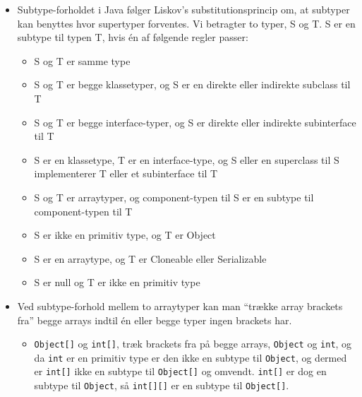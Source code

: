 \begin{itemize}
  \item Subtype-forholdet i Java følger Liskov’s substitutionsprincip om, at subtyper kan benyttes hvor supertyper forventes. Vi betragter to typer, S og T. S er en subtype til typen T, hvis én af følgende regler passer:
  \begin{itemize}
    \item S og T er samme type
    \item S og T er begge klassetyper, og S er en direkte eller indirekte subclass til T
    \item S og T er begge interface-typer, og S er direkte eller indirekte subinterface til T
    \item S er en klassetype, T er en interface-type, og S eller en superclass til S implementerer T eller et subinterface til T
    \item S og T er arraytyper, og component-typen til S er en subtype til component-typen til T
    \item S er ikke en primitiv type, og T er Object
    \item S er en arraytype, og T er Cloneable eller Serializable
    \item S er null og T er ikke en primitiv type
  \end{itemize}

  \item Ved subtype-forhold mellem to arraytyper kan man “trække array brackets fra” begge arrays indtil én eller begge typer ingen brackets har.
  \begin{itemize}
    \item \verb|Object[]| og \verb|int[]|, træk brackets fra på begge arrays, \verb|Object| og \verb|int|, og da \verb|int| er en primitiv type er den ikke en subtype til \verb|Object|, og dermed er \verb|int[]| ikke en subtype til \verb|Object[]| og omvendt. \verb|int[]| er dog en subtype til \verb|Object|, så \verb|int[][]| er en subtype til \verb|Object[]|.
  \end{itemize}
  

\end{itemize}
